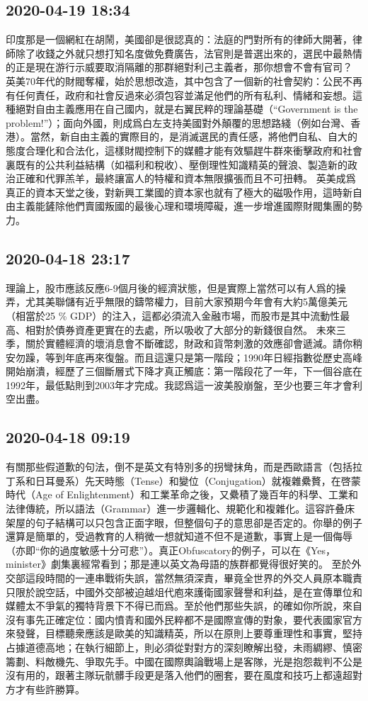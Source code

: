 \documentclass[twocolumn]{ctexart}
\begin{document}
\subsection*{2020-04-19 18:34}

印度那是一個網紅在胡鬧，美國卻是很認真的：法庭的門對所有的律師大開著，律師除了收錢之外就只想打知名度做免費廣告，法官則是普選出來的，選民中最熱情的正是現在游行示威要取消隔離的那群絕對利己主義者，那你想會不會有官司？
英美70年代的財閥奪權，始於思想改造，其中包含了一個新的社會契約：公民不再有任何責任，政府和社會反過來必須包容並滿足他們的所有私利、情緒和妄想。這種絕對自由主義應用在自己國内，就是右翼民粹的理論基礎（“Government is the problem!”）；面向外國，則成爲白左支持美國對外顛覆的思想路綫（例如台灣、香港）。當然，新自由主義的實際目的，是消滅選民的責任感，將他們自私、自大的態度合理化和合法化，這樣財閥控制下的媒體才能有效驅趕牛群來衝擊政府和社會裏既有的公共利益結構（如福利和稅收）、壓倒理性知識精英的聲浪、製造新的政治正確和代罪羔羊，最終讓富人的特權和資本無限擴張而且不可扭轉。
英美成爲真正的資本天堂之後，對新興工業國的資本家也就有了極大的磁吸作用，這時新自由主義能鏟除他們賣國叛國的最後心理和環境障礙，進一步增進國際財閥集團的勢力。
\subsection*{2020-04-18 23:17}

理論上，股市應該反應6-9個月後的經濟狀態，但是實際上當然可以有人爲的操弄，尤其美聯儲有近乎無限的鑄幣權力，目前大家預期今年會有大約5萬億美元（相當於25 \% GDP）的注入，這都必須流入金融市場，而股市是其中流動性最高、相對於債券資產更實在的去處，所以吸收了大部分的新錢很自然。
未來三季，關於實體經濟的壞消息會不斷確認，財政和貨幣刺激的效應卻會遞減。請你稍安勿躁，等到年底再來復盤。而且這還只是第一階段；1990年日經指數從歷史高峰開始崩潰，經歷了三個斷層式下降才真正觸底：第一階段花了一年，下一個谷底在1992年，最低點則到2003年才完成。我認爲這一波美股崩盤，至少也要三年才會利空出盡。
\subsection*{2020-04-18 09:19}

有關那些假道歉的句法，倒不是英文有特別多的拐彎抹角，而是西歐語言（包括拉丁系和日耳曼系）先天時態（Tense）和變位（Conjugation）就複雜纍贅，在啓蒙時代（Age of Enlightenment）和工業革命之後，又纍積了幾百年的科學、工業和法律傳統，所以語法（Grammar）進一步邏輯化、規範化和複雜化。這容許叠床架屋的句子結構可以只包含正面字眼，但整個句子的意思卻是否定的。你舉的例子還算是簡單的，受過教育的人稍微一想就知道不但不是道歉，事實上是一個侮辱（亦即“你的過度敏感十分可悲”）。真正Obfuscatory的例子，可以在《Yes，minister》劇集裏經常看到；那是連以英文為母語的族群都覺得很好笑的。 
至於外交部這段時間的一連串戰術失誤，當然無須深責，畢竟全世界的外交人員原本職責只限於說空話，中國外交部被迫越俎代庖來護衛國家聲譽和利益，是在宣傳單位和媒體太不爭氣的獨特背景下不得已而爲。至於他們那些失誤，的確如你所說，來自沒有事先正確定位：國内憤青和國外民粹都不是國際宣傳的對象，要代表國家官方來發聲，目標聽衆應該是歐美的知識精英，所以在原則上要尊重理性和事實，堅持占據道德高地；在執行細節上，則必須從對對方的深刻瞭解出發，未雨綢繆、慎密籌劃、料敵機先、爭取先手。中國在國際輿論戰場上是客隊，光是抱怨裁判不公是沒有用的，跟著主隊玩骯髒手段更是落入他們的圈套，要在風度和技巧上都遠超對方才有些許勝算。
\end{document}
